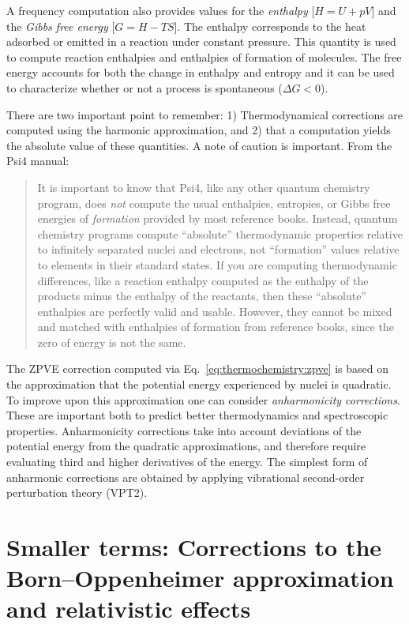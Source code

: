 \documentclass[../Main/chem371-notes.tex]{subfiles}
\begin{document}
A frequency computation also provides values for the \emph{enthalpy} [$H = U + pV$] and the \emph{Gibbs free energy} [$G = H - TS$].
The enthalpy corresponds to the heat adsorbed or emitted in a reaction under constant pressure.
This quantity is used to compute reaction enthalpies and enthalpies of formation of molecules.
The free energy accounts for both the change in enthalpy and entropy and it can be used to characterize whether or not a process is spontaneous ($\Delta G < 0$).

There are two important point to remember: 1) Thermodynamical corrections are computed using the harmonic approximation, and 2) that a computation yields the absolute value of these quantities.
A note of caution is important. From the Psi4 manual:
\begin{quote}
 It is important to know that Psi4, like any other quantum chemistry program, does \textit{not} compute the usual enthalpies, entropies, or Gibbs free energies of \textit{formation} provided by most reference books. Instead, quantum chemistry programs compute “absolute” thermodynamic properties relative to infinitely separated nuclei and electrons, not “formation” values relative to elements in their standard states. If you are computing thermodynamic differences, like a reaction enthalpy computed as the enthalpy of the products minus the enthalpy of the reactants, then these “absolute” enthalpies are perfectly valid and usable. However, they cannot be mixed and matched with enthalpies of formation from reference books, since the zero of energy is not the same.
\end{quote}


The ZPVE correction computed via Eq.~\eqref{eq:thermochemistry:zpve} is based on the approximation that the potential energy experienced by nuclei is quadratic.
To improve upon this approximation one can consider \emph{anharmonicity corrections}.
These are important both to predict better thermodynamics and spectroscopic properties.
Anharmonicity corrections take into account deviations of the potential energy from the quadratic approximations, and therefore require evaluating third and higher derivatives of the energy.
The simplest form of anharmonic corrections are obtained by applying vibrational  second-order perturbation theory (VPT2).

\section{Smaller terms: Corrections to the Born--Oppenheimer approximation and relativistic effects}
\end{document}
